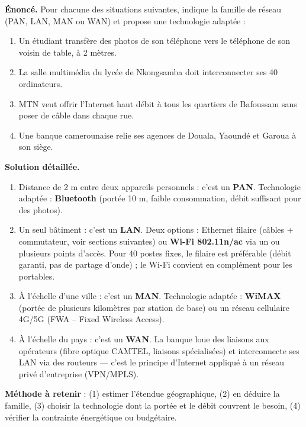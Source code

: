 \documentclass[11pt]{article}
\begin{document}
\begin{exoresolu}
\textbf{Énoncé.} Pour chacune des situations suivantes, indique la famille de réseau (PAN, LAN, MAN ou WAN) et propose une technologie adaptée :
\begin{enumerate}
\item Un étudiant transfère des photos de son téléphone vers le téléphone de son voisin de table, à 2 mètres.
\item La salle multimédia du lycée de Nkongsamba doit interconnecter ses 40 ordinateurs.
\item MTN veut offrir l'Internet haut débit à tous les quartiers de Bafoussam sans poser de câble dans chaque rue.
\item Une banque camerounaise relie ses agences de Douala, Yaoundé et Garoua à son siège.
\end{enumerate}
\tcblower
\textbf{Solution détaillée.}
\begin{enumerate}
\item Distance de 2 m entre deux appareils personnels : c'est un \textbf{PAN}. Technologie adaptée : \textbf{Bluetooth} (portée 10 m, faible consommation, débit suffisant pour des photos).
\item Un seul bâtiment : c'est un \textbf{LAN}. Deux options : Ethernet filaire (câbles + commutateur, voir sections suivantes) ou \textbf{Wi-Fi 802.11n/ac} via un ou plusieurs points d'accès. Pour 40 postes fixes, le filaire est préférable (débit garanti, pas de partage d'onde) ; le Wi-Fi convient en complément pour les portables.
\item À l'échelle d'une ville : c'est un \textbf{MAN}. Technologie adaptée : \textbf{WiMAX} (portée de plusieurs kilomètres par station de base) ou un réseau cellulaire 4G/5G (FWA -- Fixed Wireless Access).
\item À l'échelle du pays : c'est un \textbf{WAN}. La banque loue des liaisons aux opérateurs (fibre optique CAMTEL, liaisons spécialisées) et interconnecte ses LAN via des routeurs — c'est le principe d'Internet appliqué à un réseau privé d'entreprise (VPN/MPLS).
\end{enumerate}
\textbf{Méthode à retenir} : (1) estimer l'étendue géographique, (2) en déduire la famille, (3) choisir la technologie dont la portée et le débit couvrent le besoin, (4) vérifier la contrainte énergétique ou budgétaire.
\end{exoresolu}
\end{document}
